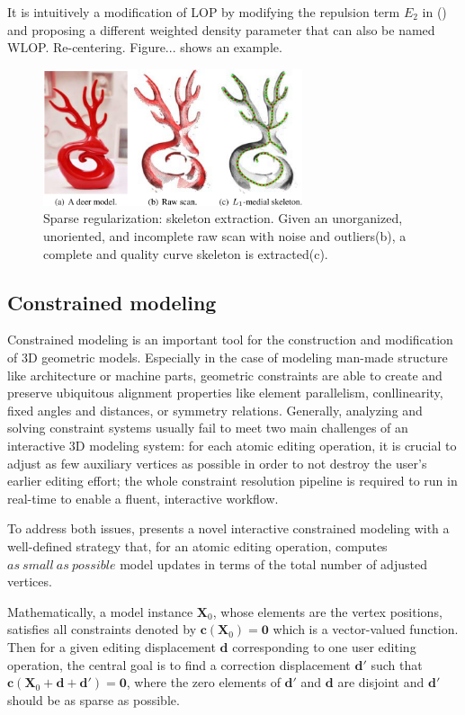 It is intuitively a modification of LOP by modifying the repulsion term $E_2$ in () and proposing a different weighted density parameter that can also be named WLOP\cite{huang2009consolidation}. Re-centering. Figure... shows an example.

\begin{figure}[ht]
  \centering
  \includegraphics[width=3in]{images/skeleton_L1}
  \caption{Sparse regularization: skeleton extraction\cite{huang2013l1}. Given an unorganized, unoriented, and incomplete raw scan with noise and outliers(b), a complete and quality curve skeleton is extracted(c).}
\end{figure}


\subsection{Constrained modeling} Constrained modeling is an important tool for the construction and modification of 3D geometric models. Especially in the case of modeling man-made structure like architecture or machine parts, geometric constraints are able to create and preserve ubiquitous alignment properties like element parallelism, conllinearity, fixed angles and distances, or symmetry relations. Generally, analyzing and solving constraint systems usually fail to meet two main challenges of an interactive 3D modeling system: for each atomic editing operation, it is crucial to adjust as few auxiliary vertices as possible in order to not destroy the user's earlier editing effort; the whole constraint resolution pipeline is required to run in real-time to enable a fluent, interactive workflow.

To address both issues, \cite{habbecke2012linear} presents a novel interactive constrained modeling with a well-defined strategy that, for an atomic editing operation, computes $as~small~as~possible$ model updates in terms of the total number of adjusted vertices.

Mathematically, a model instance $\mathbf{X}_0$, whose elements are the vertex positions, satisfies all constraints denoted by $\mathbf{c}(\mathbf{X}_0)=\mathbf{0}$ which is a vector-valued function. Then for a given editing displacement $\mathbf{d}$ corresponding to one user editing operation, the central goal is to find a correction displacement $\mathbf{d'}$  such that $\mathbf{c}(\mathbf{X}_0+\mathbf{d}+\mathbf{d'})=\mathbf{0}$, where the zero elements of $\mathbf{d'}$ and $\mathbf{d}$ are disjoint and $\mathbf{d'}$ should be as sparse as possible.

